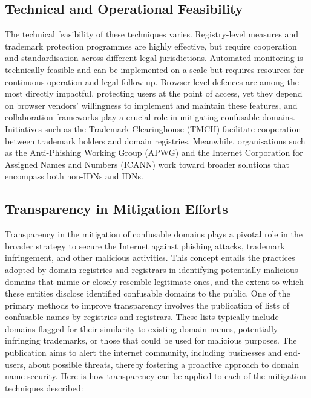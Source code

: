 \subsection{Technical and Operational Feasibility}
The technical feasibility of these techniques varies. Registry-level measures and trademark protection programmes are highly effective, but require cooperation and standardisation across different legal jurisdictions. Automated monitoring is technically feasible and can be implemented on a scale but requires resources for continuous operation and legal follow-up. Browser-level defences are among the most directly impactful, protecting users at the point of access, yet they depend on browser vendors' willingness to implement and maintain these features, and collaboration frameworks play a crucial role in mitigating confusable domains. Initiatives such as the Trademark Clearinghouse (TMCH) facilitate cooperation between trademark holders and domain registries. Meanwhile, organisations such as the Anti-Phishing Working Group (APWG) and the Internet Corporation for Assigned Names and Numbers (ICANN) work toward broader solutions that encompass both non-IDNs and IDNs.

\subsection{ Transparency in Mitigation Efforts}

Transparency in the mitigation of confusable domains plays a pivotal role in the broader strategy to secure the Internet against phishing attacks, trademark infringement, and other malicious activities. This concept entails the practices adopted by domain registries and registrars in identifying potentially malicious domains that mimic or closely resemble legitimate ones, and the extent to which these entities disclose identified confusable domains to the public. One of the primary methods to improve transparency involves the publication of lists of confusable names by registries and registrars. These lists typically include domains flagged for their similarity to existing domain names, potentially infringing trademarks, or those that could be used for malicious purposes. The publication aims to alert the internet community, including businesses and end-users, about possible threats, thereby fostering a proactive approach to domain name security. Here is how transparency can be applied to each of the mitigation techniques described:

